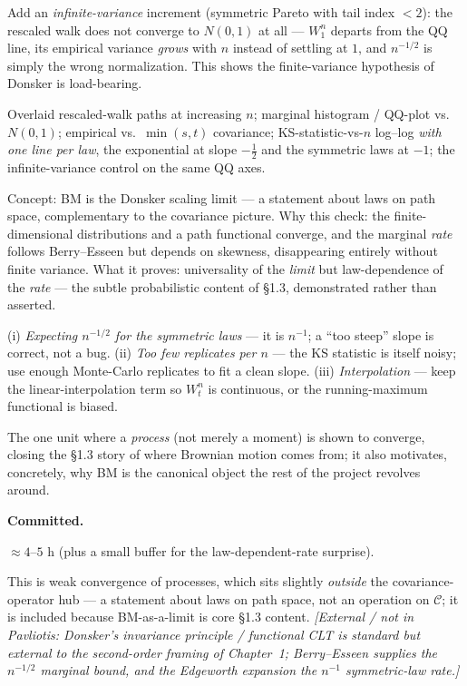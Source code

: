 \documentclass[11pt]{article}
\newcommand{\extnote}[1]{{\small\color{extgray}\emph{[External / not in Pavliotis: #1]}}}
\newenvironment{unitmeta}{%
  \begin{description}[style=sameline,leftmargin=1.4cm,font=\bfseries\color{hubblue}]
}{%
  \end{description}
}
\begin{document}
\begin{unitmeta}
\item[Negative control] Add an \emph{infinite-variance} increment (symmetric Pareto with tail index $<2$): the rescaled walk does not converge to $N(0,1)$ at all --- $W^n_1$ departs from the QQ line, its empirical variance \emph{grows} with $n$ instead of settling at $1$, and $n^{-1/2}$ is simply the wrong normalization. This shows the finite-variance hypothesis of Donsker is load-bearing.
\item[Artifact] Overlaid rescaled-walk paths at increasing $n$; marginal histogram / QQ-plot vs.\ $N(0,1)$; empirical vs.\ $\min(s,t)$ covariance; KS-statistic-vs-$n$ log--log \emph{with one line per law}, the exponential at slope $-\tfrac12$ and the symmetric laws at $-1$; the infinite-variance control on the same QQ axes.
\item[README] Concept: BM is the Donsker scaling limit --- a statement about laws on path space, complementary to the covariance picture. Why this check: the finite-dimensional distributions and a path functional converge, and the marginal \emph{rate} follows Berry--Esseen but depends on skewness, disappearing entirely without finite variance. What it proves: universality of the \emph{limit} but law-dependence of the \emph{rate} --- the subtle probabilistic content of \S1.3, demonstrated rather than asserted.
\item[Missteps] (i) \emph{Expecting $n^{-1/2}$ for the symmetric laws} --- it is $n^{-1}$; a ``too steep'' slope is correct, not a bug. (ii) \emph{Too few replicates per $n$} --- the KS statistic is itself noisy; use enough Monte-Carlo replicates to fit a clean slope. (iii) \emph{Interpolation} --- keep the linear-interpolation term so $W^n_t$ is continuous, or the running-maximum functional is biased.
\item[Purpose] The one unit where a \emph{process} (not merely a moment) is shown to converge, closing the \S1.3 story of where Brownian motion comes from; it also motivates, concretely, why BM is the canonical object the rest of the project revolves around.
\item[Status] \textbf{Committed.}
\item[Effort] $\approx 4$--$5$ h (plus a small buffer for the law-dependent-rate surprise).
\item[Prerequisite] This is weak convergence of processes, which sits slightly \emph{outside} the covariance-operator hub --- a statement about laws on path space, not an operation on $\mathcal{C}$; it is included because BM-as-a-limit is core \S1.3 content. \extnote{Donsker's invariance principle / functional CLT is standard but external to the second-order framing of Chapter~1; Berry--Esseen supplies the $n^{-1/2}$ marginal bound, and the Edgeworth expansion the $n^{-1}$ symmetric-law rate.}
\end{unitmeta}
\end{document}
